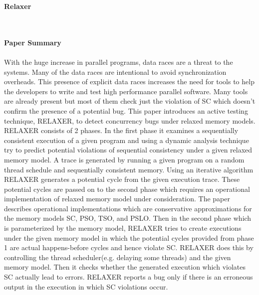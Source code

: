 \documentclass[20pt]{letter}
\begin{document}
\begin{enumerate}
\pagebreak
{ \Large
\item
\begin{center}
    \textbf{Relaxer}
\end{center}
}
{ \fontsize{13}{17}\selectfont\\

\textbf{\\Paper Summary}\\\\
With the huge increase in parallel programs, data races are a threat to the systems. Many of the data races are intentional to avoid synchronization overheads. This presence of explicit data races increases the need for tools to help the developers to write and test high performance parallel software. Many tools are already present but most of them check just the violation of SC which doesn't confirm the presence of a potential bug. This paper introduces an active testing technique, RELAXER, to detect concurrency bugs under relaxed memory models.\\

RELAXER consists of 2 phases. In the first phase it examines a sequentially consistent execution of a given program and using a dynamic analysis technique try to predict potential violations of sequential consistency under a given relaxed memory model. A trace is generated by running a given program on a random thread schedule and sequentially consistent memory. Using an iterative algorithm RELAXER generates a potential cycle from the given execution trace. These potential cycles are passed on to the second phase which requires an operational implementation of relaxed memory model under consideration. The paper describes operational implementations which are conservative approximations for the memory models SC, PSO, TSO, and PSLO. Then in the second phase which is parameterized by the memory model, RELAXER tries to create executions under the given memory model in which the potential cycles provided from phase 1 are actual happens-before cycles and hence violate SC. RELAXER does this by controlling the thread scheduler(e.g. delaying some threads) and the given memory model. Then it checks whether the generated execution which violates SC actually lead to errors. RELAXER reports a bug only if there is an erroneous output in the execution in which SC violations occur.\\

}
\end{enumerate}
\end{document}
